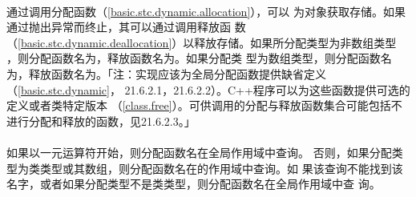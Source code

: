 \paragraph{}
通过调用分配函数（\ref{basic.stc.dynamic.allocation}），可以
为对象获取存储。如果通过抛出异常而终止，其可以通过调用释放函
数（\ref{basic.stc.dynamic.deallocation}）以释放存储。如果所分配类型为非数组类型
，则分配函数名为，释放函数名为。如果分配类
型为数组类型，则分配函数名为，释放函数名为。「注：实现应该为全局分配函数提供缺省定义（\ref{basic.stc.dynamic}，
21.6.2.1，21.6.2.2）。C++程序可以为这些函数提供可选的定义或者类特定版本
（\ref{class.free}）。可供调用的分配与释放函数集合可能包括不
进行分配和释放的函数，见21.6.2.3。」

\paragraph{}
如果以一元\tm{::}运算符开始，则分配函数名在全局作用域中查询。
否则，如果分配类型为类类型或其数组，则分配函数名在的作用域中查询。如
果该查询不能找到该名字，或者如果分配类型不是类类型，则分配函数名在全局作用域中查
询。

